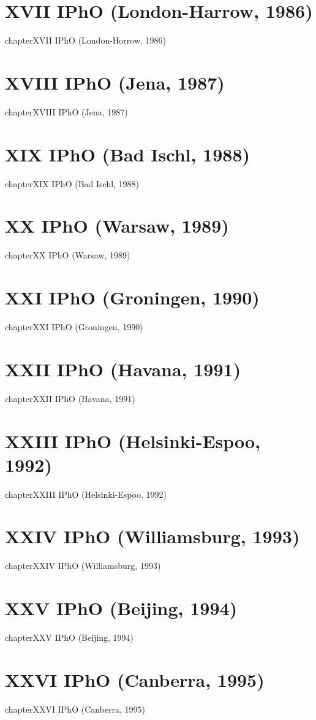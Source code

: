 \documentclass[12pt,a4paper]{book}
\begin{document}
\chapter*{XVII IPhO (London-Harrow, 1986)}
{chapter}{XVII IPhO (London-Horrow, 1986)}
\chapter*{XVIII IPhO (Jena, 1987)}
{chapter}{XVIII IPhO (Jena, 1987)}
\chapter*{XIX IPhO (Bad Ischl, 1988)}
{chapter}{XIX IPhO (Bad Ischl, 1988)}
\chapter*{XX IPhO (Warsaw, 1989)}
{chapter}{XX IPhO (Warsaw, 1989)}
\chapter*{XXI IPhO (Groningen, 1990)}
{chapter}{XXI IPhO (Groningen, 1990)}
\chapter*{XXII IPhO (Havana, 1991)}
{chapter}{XXII IPhO (Havana, 1991)}
\chapter*{XXIII IPhO (Helsinki-Espoo, 1992)}
{chapter}{XXIII IPhO (Helsinki-Espoo, 1992)}
\chapter*{XXIV IPhO (Williamsburg, 1993)}
{chapter}{XXIV IPhO (Williamsburg, 1993)}
\chapter*{XXV IPhO (Beijing, 1994)}
{chapter}{XXV IPhO (Beijing, 1994)}
\chapter*{XXVI IPhO (Canberra, 1995)}
{chapter}{XXVI IPhO (Canberra, 1995)}
\end{document}

